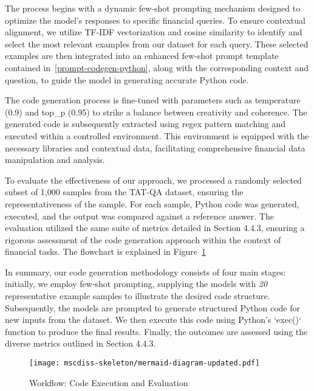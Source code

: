\documentclass[logo,msc]{infthesis}           %
\begin{document}
The process begins with a dynamic few-shot prompting mechanism designed to optimize the model's responses to specific financial queries. To ensure contextual alignment, we utilize TF-IDF vectorization and cosine similarity to identify and select the most relevant examples from our dataset for each query. These selected examples are then integrated into an enhanced few-shot prompt template contained in~\ref{prompt-codegen-python}, along with the corresponding context and question, to guide the model in generating accurate Python code.

The code generation process is fine-tuned with parameters such as temperature (0.9) and top\_p (0.95) to strike a balance between creativity and coherence. The generated code is subsequently extracted using regex pattern matching and executed within a controlled environment. This environment is equipped with the necessary libraries and contextual data, facilitating comprehensive financial data manipulation and analysis.

To evaluate the effectiveness of our approach, we processed a randomly selected subset of 1,000 samples from the TAT-QA dataset, ensuring the representativeness of the sample. For each sample, Python code was generated, executed, and the output was compared against a reference answer. The evaluation utilized the same suite of metrics detailed in Section 4.4.3, ensuring a rigorous assessment of the code generation approach within the context of financial tasks. The flowchart is explained in Figure~\ref{fig:methodology-flow}

In summary, our code generation methodology consists of four main stages: initially, we employ few-shot prompting, supplying the models with \textit{20} representative example samples to illustrate the desired code structure. Subsequently, the models are prompted to generate structured Python code for new inputs from the dataset. We then execute this code using Python’s `exec()` function to produce the final results. Finally, the outcomes are assessed using the diverse metrics outlined in Section 4.4.3.

\begin{figure}
    \centering
    \texttt{[image: mscdiss-skeleton/mermaid-diagram-updated.pdf]}
    \caption{Workflow: Code Execution and Evaluation}
    \label{fig:methodology-flow}
\end{figure}
\end{document}
